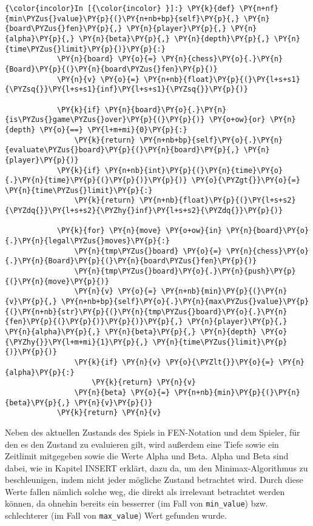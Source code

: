     \begin{Verbatim}[commandchars=\\\{\}]
{\color{incolor}In [{\color{incolor} }]:} \PY{k}{def} \PY{n+nf}{min\PYZus{}value}\PY{p}{(}\PY{n+nb+bp}{self}\PY{p}{,} \PY{n}{board\PYZus{}fen}\PY{p}{,} \PY{n}{player}\PY{p}{,} \PY{n}{alpha}\PY{p}{,} \PY{n}{beta}\PY{p}{,} \PY{n}{depth}\PY{p}{,} \PY{n}{time\PYZus{}limit}\PY{p}{)}\PY{p}{:}
            \PY{n}{board} \PY{o}{=} \PY{n}{chess}\PY{o}{.}\PY{n}{Board}\PY{p}{(}\PY{n}{board\PYZus{}fen}\PY{p}{)}
            \PY{n}{v} \PY{o}{=} \PY{n+nb}{float}\PY{p}{(}\PY{l+s+s1}{\PYZsq{}}\PY{l+s+s1}{inf}\PY{l+s+s1}{\PYZsq{}}\PY{p}{)}
        
            \PY{k}{if} \PY{n}{board}\PY{o}{.}\PY{n}{is\PYZus{}game\PYZus{}over}\PY{p}{(}\PY{p}{)} \PY{o+ow}{or} \PY{n}{depth} \PY{o}{==} \PY{l+m+mi}{0}\PY{p}{:}
                \PY{k}{return} \PY{n+nb+bp}{self}\PY{o}{.}\PY{n}{evaluate\PYZus{}board}\PY{p}{(}\PY{n}{board}\PY{p}{,} \PY{n}{player}\PY{p}{)}
            \PY{k}{if} \PY{n+nb}{int}\PY{p}{(}\PY{n}{time}\PY{o}{.}\PY{n}{time}\PY{p}{(}\PY{p}{)}\PY{p}{)} \PY{o}{\PYZgt{}}\PY{o}{=} \PY{n}{time\PYZus{}limit}\PY{p}{:}
                \PY{k}{return} \PY{n+nb}{float}\PY{p}{(}\PY{l+s+s2}{\PYZdq{}}\PY{l+s+s2}{\PYZhy{}inf}\PY{l+s+s2}{\PYZdq{}}\PY{p}{)}
        
            \PY{k}{for} \PY{n}{move} \PY{o+ow}{in} \PY{n}{board}\PY{o}{.}\PY{n}{legal\PYZus{}moves}\PY{p}{:}
                \PY{n}{tmp\PYZus{}board} \PY{o}{=} \PY{n}{chess}\PY{o}{.}\PY{n}{Board}\PY{p}{(}\PY{n}{board\PYZus{}fen}\PY{p}{)}
                \PY{n}{tmp\PYZus{}board}\PY{o}{.}\PY{n}{push}\PY{p}{(}\PY{n}{move}\PY{p}{)}
                \PY{n}{v} \PY{o}{=} \PY{n+nb}{min}\PY{p}{(}\PY{n}{v}\PY{p}{,} \PY{n+nb+bp}{self}\PY{o}{.}\PY{n}{max\PYZus{}value}\PY{p}{(}\PY{n+nb}{str}\PY{p}{(}\PY{n}{tmp\PYZus{}board}\PY{o}{.}\PY{n}{fen}\PY{p}{(}\PY{p}{)}\PY{p}{)}\PY{p}{,} \PY{n}{player}\PY{p}{,} \PY{n}{alpha}\PY{p}{,} \PY{n}{beta}\PY{p}{,} \PY{n}{depth} \PY{o}{\PYZhy{}}\PY{l+m+mi}{1}\PY{p}{,} \PY{n}{time\PYZus{}limit}\PY{p}{)}\PY{p}{)}
                \PY{k}{if} \PY{n}{v} \PY{o}{\PYZlt{}}\PY{o}{=} \PY{n}{alpha}\PY{p}{:}
                    \PY{k}{return} \PY{n}{v}
                \PY{n}{beta} \PY{o}{=} \PY{n+nb}{min}\PY{p}{(}\PY{n}{beta}\PY{p}{,} \PY{n}{v}\PY{p}{)}
            \PY{k}{return} \PY{n}{v}
\end{Verbatim}

    Neben des aktuellen Zustands des Spiels in FEN-Notation und dem Spieler,
für den es den Zustand zu evaluieren gilt, wird außerdem eine Tiefe
sowie ein Zeitlimit mitgegeben sowie die Werte Alpha und Beta. Alpha und
Beta sind dabei, wie in Kapitel INSERT erklärt, dazu da, um den
Minimax-Algorithmus zu beschleunigen, indem nicht jeder mögliche Zustand
betrachtet wird. Durch diese Werte fallen nämlich solche weg, die direkt
als irrelevant betrachtet werden können, da ohnehin bereits ein
besserrer (im Fall von \texttt{min\_value}) bzw. schlechterer (im Fall
von \texttt{max\_value}) Wert gefunden wurde.

